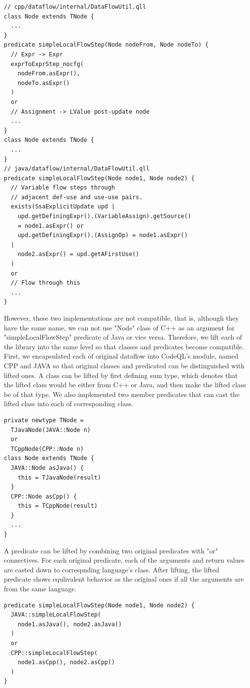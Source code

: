 \begin{lstlisting}[style=codeql,xleftmargin=2.5em]
// cpp/dataflow/internal/DataFlowUtil.qll
class Node extends TNode {
  ...
}
predicate simpleLocalFlowStep(Node nodeFrom, Node nodeTo) {
  // Expr -> Expr
  exprToExprStep_nocfg(
    nodeFrom.asExpr(),
    nodeTo.asExpr()
  )
  or
  // Assignment -> LValue post-update node
  ...
}
class Node extends TNode {
  ...
}
// java/dataflow/internal/DataFlowUtil.qll
predicate simpleLocalFlowStep(Node node1, Node node2) {
  // Variable flow steps through
  // adjacent def-use and use-use pairs.
  exists(SsaExplicitUpdate upd |
    upd.getDefiningExpr().(VariableAssign).getSource()
    = node1.asExpr() or
    upd.getDefiningExpr().(AssignOp) = node1.asExpr()
  |
    node2.asExpr() = upd.getAFirstUse()
  )
  or
  // Flow through this
  ...
}
\end{lstlisting}
However, these two implementations are not compatible, that is, although they have the same name,
we can not use "Node" class of C++ as an argument for "simpleLocalFlowStep" predicate of Java or vice versa.
Therefore, we lift each of the library into the same level so that classes and predicates become compatible.
First, we encapsulated each of original dataflow into CodeQL's module, named CPP and JAVA so that
original classes and predicated can be distinguished with lifted ones.
A class can be lifted by first defining sum type, which denotes that the lifted class would be either from C++ or
Java, and then make the lifted class be of that type. We also implemented two member predicates that can cast
the lifted class into each of corresponding class.
\begin{lstlisting}[style=codeql,xleftmargin=2.5em]
private newtype TNode =
  TJavaNode(JAVA::Node n)
  or
  TCppNode(CPP::Node n)
class Node extends TNode {
  JAVA::Node asJava() {
    this = TJavaNode(result)
  }
  CPP::Node asCpp() {
    this = TCppNode(result)
  }
  ...
}
\end{lstlisting}

A predicate can be lifted by combining two original predicates with "or"
connectives.  For each original predicate, each of the arguments and return
values are casted down to correspnding language's class. After lifting, the
lifted predicate shows equlivalent behavior as the original ones if all the
arguments are from the same language.
\begin{lstlisting}[style=codeql,xleftmargin=2.5em]
predicate simpleLocalFlowStep(Node node1, Node node2) {
  JAVA::simpleLocalFlowStep(
    node1.asJava(), node2.asJava()
  )
  or
  CPP::simpleLocalFlowStep(
    node1.asCpp(), node2.asCpp()
  )
}
\end{lstlisting}
